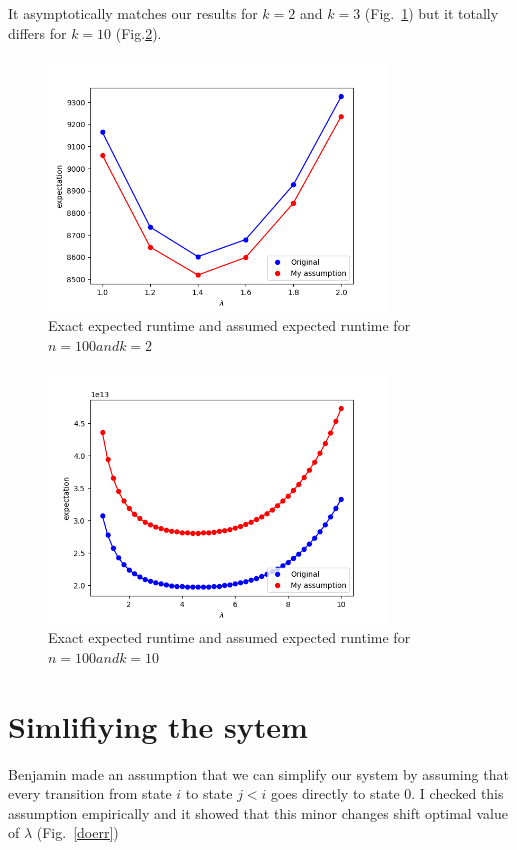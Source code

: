 \documentclass{article}
\begin{document}
It asymptotically matches our results for $k = 2$ and $k = 3$ (Fig.~\ref{asmp2}) but it totally differs for $k = 10$ (Fig.\ref{asmp10}).

\begin{figure}
 \includegraphics[width=0.8\textwidth]{pic/my_assumption_k2.png}
 \caption{Exact expected runtime and assumed expected runtime for $n = 100 and k = 2$
 \label{asmp2}}
\end{figure}

\begin{figure}
 \includegraphics[width=0.8\textwidth]{pic/my_assumption_k10.png}
 \caption{Exact expected runtime and assumed expected runtime for $n = 100 and k = 10$
 \label{asmp10}}
\end{figure}

\section{Simlifiying the sytem}

Benjamin made an assumption that we can simplify our system by assuming that every transition from state $i$ to state $j < i$ goes directly to state $0$. I checked this assumption empirically and it showed that this minor changes shift optimal value of $\lambda$ (Fig.~\ref{doerr})
\end{document}
